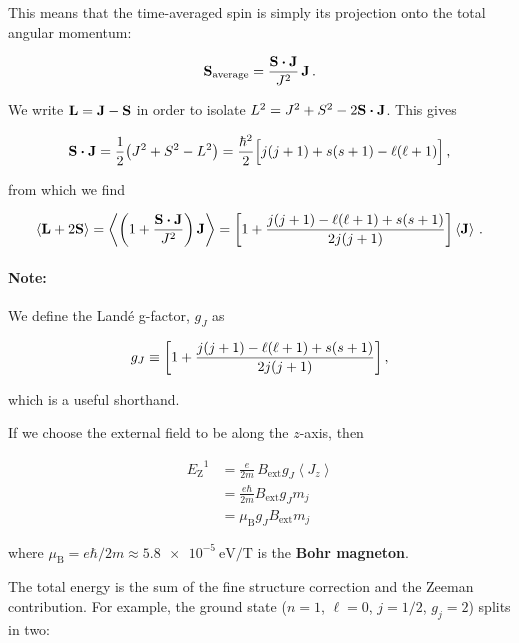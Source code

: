 \documentclass[12pt, titlepage]{article}
\newcommand{\exv}[1]{\left\langle #1 \right\rangle}
\begin{document}

This means that the time-averaged spin is simply its projection onto the total angular momentum:

\begin{equation}
	\vb{S}_\text{average} = \frac{\vb{S}\vdot\vb{J}}{J^2} \,\vb{J} \,.
\end{equation}

We write $\vb{L} = \vb{J}-\vb{S}$ in order to isolate $L^2 = J^2 +S^2 - 2\vb{S}\vdot\vb{J}$. This gives

\begin{equation}
	\vb{S}\vdot\vb{J} = \frac{1}{2}\bigl(J^2+S^2-L^2\bigr) = \frac{\hbar^2}{2}\Bigl[j(j+1) + s(s+1) - \ell(\ell+1)\Bigr] \,,
\end{equation}

from which we find 

\begin{equation}
	\exv{\vb{L} + 2\vb{S}} = \exv{\qty(1+\frac{\vb{S}\vdot\vb{J}}{J^2})\,\vb{J}} = \qty[1+\frac{j(j+1) - \ell(\ell+1) + s(s+1)}{2j(j+1)}]\exv{\vb{J}} \,.
\end{equation}

\begin{mdframed}
\paragraph*{Note:} We define the Landé g-factor, $g_J$ as 

\begin{equation}
	g_J \equiv \qty[1+\frac{j(j+1) - \ell(\ell+1) + s(s+1)}{2j(j+1)}] \,,
\end{equation}

which is a useful shorthand.
\end{mdframed}

If we choose the external field to be along the $z$-axis, then

\begin{align}
	{E_\text{Z}}^1 &= \frac{e}{2m}\,B_\text{ext} g_J \exv{J_z} \nonumber \\[4pt]
	&= \frac{e\hbar}{2m} B_\text{ext}g_Jm_j \nonumber \\[4pt]
	&= \mu_\text{B} g_J B_\text{ext}m_j
\end{align}

where $\mu_\text{B} = e\hbar/2m \approx \SI{5.8e-5}{\eV\per\tesla}$ is the \textbf{Bohr magneton}.

The total energy is the sum of the fine structure correction and the Zeeman contribution. For example, the ground state ($n=1$, $\ell=0$, $j=1/2$, $g_j=2$) splits in two:
\end{document}
